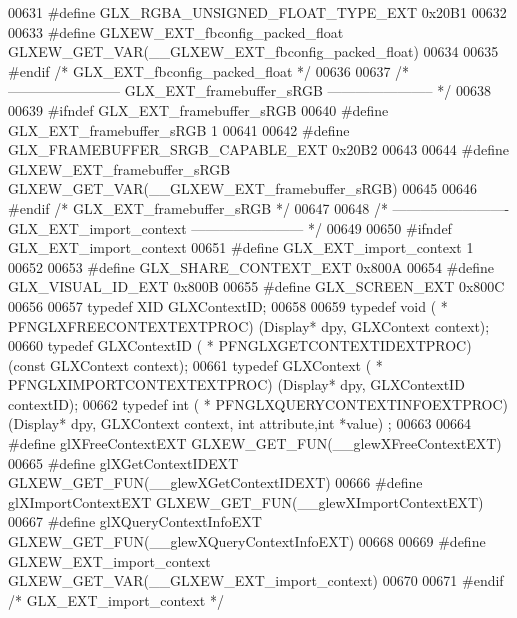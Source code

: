 \begin{DoxyCode}
00631 \textcolor{preprocessor}{#define GLX\_RGBA\_UNSIGNED\_FLOAT\_TYPE\_EXT 0x20B1}
00632 
00633 \textcolor{preprocessor}{#define GLXEW\_EXT\_fbconfig\_packed\_float GLXEW\_GET\_VAR(\_\_GLXEW\_EXT\_fbconfig\_packed\_float)}
00634 
00635 \textcolor{preprocessor}{#endif }\textcolor{comment}{/* GLX\_EXT\_fbconfig\_packed\_float */}\textcolor{preprocessor}{}
00636 
00637 \textcolor{comment}{/* ------------------------ GLX\_EXT\_framebuffer\_sRGB ----------------------- */}
00638 
00639 \textcolor{preprocessor}{#ifndef GLX\_EXT\_framebuffer\_sRGB}
00640 \textcolor{preprocessor}{#define GLX\_EXT\_framebuffer\_sRGB 1}
00641 
00642 \textcolor{preprocessor}{#define GLX\_FRAMEBUFFER\_SRGB\_CAPABLE\_EXT 0x20B2}
00643 
00644 \textcolor{preprocessor}{#define GLXEW\_EXT\_framebuffer\_sRGB GLXEW\_GET\_VAR(\_\_GLXEW\_EXT\_framebuffer\_sRGB)}
00645 
00646 \textcolor{preprocessor}{#endif }\textcolor{comment}{/* GLX\_EXT\_framebuffer\_sRGB */}\textcolor{preprocessor}{}
00647 
00648 \textcolor{comment}{/* ------------------------- GLX\_EXT\_import\_context ------------------------ */}
00649 
00650 \textcolor{preprocessor}{#ifndef GLX\_EXT\_import\_context}
00651 \textcolor{preprocessor}{#define GLX\_EXT\_import\_context 1}
00652 
00653 \textcolor{preprocessor}{#define GLX\_SHARE\_CONTEXT\_EXT 0x800A}
00654 \textcolor{preprocessor}{#define GLX\_VISUAL\_ID\_EXT 0x800B}
00655 \textcolor{preprocessor}{#define GLX\_SCREEN\_EXT 0x800C}
00656 
00657 \textcolor{keyword}{typedef} XID GLXContextID;
00658 
00659 \textcolor{keyword}{typedef} void ( * PFNGLXFREECONTEXTEXTPROC) (Display* dpy, GLXContext context);
00660 \textcolor{keyword}{typedef} GLXContextID ( * PFNGLXGETCONTEXTIDEXTPROC) (\textcolor{keyword}{const} GLXContext context);
00661 \textcolor{keyword}{typedef} GLXContext ( * PFNGLXIMPORTCONTEXTEXTPROC) (Display* dpy, GLXContextID contextID);
00662 \textcolor{keyword}{typedef} int ( * PFNGLXQUERYCONTEXTINFOEXTPROC) (Display* dpy, GLXContext context, \textcolor{keywordtype}{int} attribute,\textcolor{keywordtype}{int} *value)
      ;
00663 
00664 \textcolor{preprocessor}{#define glXFreeContextEXT GLXEW\_GET\_FUN(\_\_glewXFreeContextEXT)}
00665 \textcolor{preprocessor}{#define glXGetContextIDEXT GLXEW\_GET\_FUN(\_\_glewXGetContextIDEXT)}
00666 \textcolor{preprocessor}{#define glXImportContextEXT GLXEW\_GET\_FUN(\_\_glewXImportContextEXT)}
00667 \textcolor{preprocessor}{#define glXQueryContextInfoEXT GLXEW\_GET\_FUN(\_\_glewXQueryContextInfoEXT)}
00668 
00669 \textcolor{preprocessor}{#define GLXEW\_EXT\_import\_context GLXEW\_GET\_VAR(\_\_GLXEW\_EXT\_import\_context)}
00670 
00671 \textcolor{preprocessor}{#endif }\textcolor{comment}{/* GLX\_EXT\_import\_context */}\textcolor{preprocessor}{}

\end{DoxyCode}
